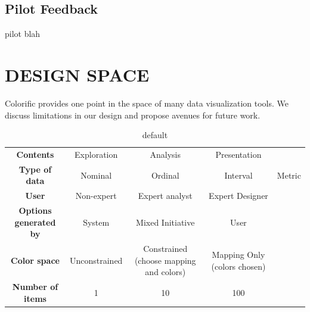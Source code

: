 \documentclass{article}
\newcommand{\system}{Colorific\xspace}
\newcommand{\graycol}{\cellcolor[gray]{0.7}}
\begin{document}

\subsection{Pilot Feedback}
pilot blah

\section{DESIGN SPACE}
\system provides one point in the space of many data visualization tools. We discuss limitations in our design and propose avenues for future work. 

\begin{table}[htdp]
\caption{default}
\begin{center}
\begin{tabular}{ cccc l}
\toprule
\textbf{Contents}   & Exploration & \graycol{} Analysis & \graycol{}Presentation \\
\textbf{Type of data}  & \graycol Nominal & \graycol Ordinal & Interval & Metric \\
\textbf{User} & \graycol Non-expert & Expert analyst & Expert Designer \\
\textbf{Options generated by} & System & \graycol Mixed Initiative & User \\
\textbf{Color space}  & \graycol Unconstrained & Constrained (choose mapping and colors)  & Mapping Only (colors chosen) \\ 
\textbf{Number of items} & \graycol 1 & \graycol 10 & 100 \\
\bottomrule
\end{tabular}
\end{center}
\label{default}
\end{table}%
\end{document}
